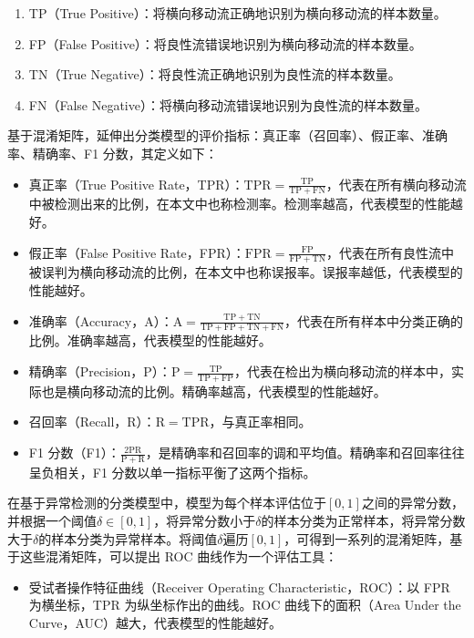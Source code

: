 {\begin{enumerate}
    \item TP（True Positive）：将横向移动流正确地识别为横向移动流的样本数量。
    \item FP（False Positive）：将良性流错误地识别为横向移动流的样本数量。
    \item TN（True Negative）：将良性流正确地识别为良性流的样本数量。
    \item FN（False Negative）：将横向移动流错误地识别为良性流的样本数量。
\end{enumerate}

基于混淆矩阵，延伸出分类模型的评价指标：真正率（召回率）、假正率、准确率、精确率、F1 分数，其定义如下：

\begin{itemize}
    \item 真正率（True Positive Rate，TPR）：$\mathrm{TPR}=\frac{\mathrm{TP}}{\mathrm{TP}+\mathrm{FN}}$，代表在所有横向移动流中被检测出来的比例，在本文中也称检测率。检测率越高，代表模型的性能越好。
    \item 假正率（False Positive Rate，FPR）：$\mathrm{FPR}=\frac{\mathrm{FP}}{\mathrm{FP}+\mathrm{TN}}$，代表在所有良性流中被误判为横向移动流的比例，在本文中也称误报率。误报率越低，代表模型的性能越好。
    \item 准确率（Accuracy，A）：$\mathrm{A}=\frac{\mathrm{TP}+\mathrm{TN}}{\mathrm{TP}+\mathrm{FP}+\mathrm{TN}+\mathrm{FN}}$，代表在所有样本中分类正确的比例。准确率越高，代表模型的性能越好。
    \item 精确率（Precision，P）：$\mathrm{P}=\frac{\mathrm{TP}}{\mathrm{TP}+\mathrm{FP}}$，代表在检出为横向移动流的样本中，实际也是横向移动流的比例。精确率越高，代表模型的性能越好。
    \item 召回率（Recall，R）：$\mathrm{R}=\mathrm{TPR}$，与真正率相同。
    \item F1 分数（F1）：$\frac{2\mathrm{P}\mathrm{R}}{\mathrm{P}+\mathrm{R}}$，是精确率和召回率的调和平均值。精确率和召回率往往呈负相关，F1 分数以单一指标平衡了这两个指标。
\end{itemize}

在基于异常检测的分类模型中，模型为每个样本评估位于$\left[0,1\right]$之间的异常分数，并根据一个阈值$\delta\in\left[0,1\right]$，将异常分数小于$\delta$的样本分类为正常样本，将异常分数大于$\delta$的样本分类为异常样本。将阈值$\delta$遍历$\left[0,1\right]$，可得到一系列的混淆矩阵，基于这些混淆矩阵，可以提出 ROC 曲线作为一个评估工具：

\begin{itemize}
    \item 受试者操作特征曲线（Receiver Operating Characteristic，ROC）：以 FPR 为横坐标，TPR 为纵坐标作出的曲线。ROC 曲线下的面积（Area Under the Curve，AUC）越大，代表模型的性能越好。
\end{itemize}

}
